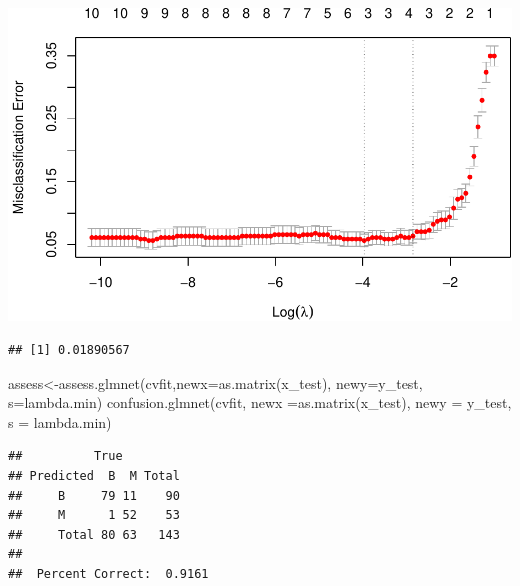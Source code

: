 \documentclass[
  11pt,
]{article}
\newenvironment{Shaded}{\begin{snugshade}}{\end{snugshade}}
\newcommand{\AttributeTok}[1]{\textcolor[rgb]{0.77,0.63,0.00}{#1}}
\newcommand{\DecValTok}[1]{\textcolor[rgb]{0.00,0.00,0.81}{#1}}
\newcommand{\FunctionTok}[1]{\textcolor[rgb]{0.00,0.00,0.00}{#1}}
\newcommand{\NormalTok}[1]{#1}
\newcommand{\OtherTok}[1]{\textcolor[rgb]{0.56,0.35,0.01}{#1}}
\newcommand{\SpecialCharTok}[1]{\textcolor[rgb]{0.00,0.00,0.00}{#1}}
\newcommand{\StringTok}[1]{\textcolor[rgb]{0.31,0.60,0.02}{#1}}
\begin{document}
\includegraphics{stat_DAP_files/figure-latex/unnamed-chunk-17-1.pdf}

\begin{Shaded}
\end{Shaded}

\begin{verbatim}
## [1] 0.01890567
\end{verbatim}

\begin{Shaded}
\begin{Highlighting}[]
\NormalTok{assess}\OtherTok{\textless{}{-}}\FunctionTok{assess.glmnet}\NormalTok{(cvfit,}\AttributeTok{newx=}\FunctionTok{as.matrix}\NormalTok{(x\_test), }\AttributeTok{newy=}\NormalTok{y\_test, }\AttributeTok{s=}\StringTok{\textquotesingle{}lambda.min\textquotesingle{}}\NormalTok{)}
\FunctionTok{confusion.glmnet}\NormalTok{(cvfit, }\AttributeTok{newx =}\FunctionTok{as.matrix}\NormalTok{(x\_test), }\AttributeTok{newy =}\NormalTok{ y\_test, }\AttributeTok{s =} \StringTok{\textquotesingle{}lambda.min\textquotesingle{}}\NormalTok{)}
\end{Highlighting}
\end{Shaded}

\begin{verbatim}
##          True
## Predicted  B  M Total
##     B     79 11    90
##     M      1 52    53
##     Total 80 63   143
## 
##  Percent Correct:  0.9161
\end{verbatim}

\begin{Shaded}
\end{Shaded}
\end{document}
